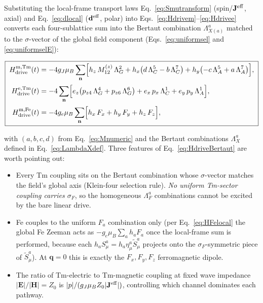 \documentclass[reprint,amsmath,amssymb,aps,prb,longbibliography]{revtex4-2}
\newcommand{\Jeff}{\mathbf{J}^{\rm eff}}
\newcommand{\deff}{\mathbf{d}^{\rm eff}}
\newcommand{\bfH}{\mathbf{H}}
\newcommand{\bfE}{\mathbf{E}}
\begin{document}
Substituting the local-frame transport laws Eq.~\eqref{eq:Smutransform}
(spin/$\Jeff$, axial) and Eq.~\eqref{eq:dlocal} ($\deff$, polar) into
Eqs.~\eqref{eq:Hdrivem}--\eqref{eq:Hdrivee} converts each four-sublattice
sum into the Bertaut combination $\Lambda^a_{X(a)}$ matched to
the $\sigma$-vector of the global field component (Eqs.~\eqref{eq:uniformsel}
and \eqref{eq:uniformselE}):
\begin{widetext}
\begin{equation}
\boxed{\;
\begin{aligned}
H_{\rm drive}^{\rm m,Tm}(t) &= -4 g_J\mu_B\sum_{\mathbf n}\Bigl[
h_z\,M^{(z)}_{12}\,\Lambda^2_G
+ h_x\bigl(d\,\Lambda^5_C - b\,\Lambda^7_C\bigr)
+ h_y\bigl(-c\,\Lambda^5_A + a\,\Lambda^7_A\bigr)
\Bigr],\\[2pt]
H_{\rm drive}^{\rm e,Tm}(t) &= -4\sum_{\mathbf n}\Bigl[
e_z\bigl(p_{z4}\,\Lambda^4_G + p_{z6}\,\Lambda^6_G\bigr)
+ e_x\,p_x\,\Lambda^1_C
+ e_y\,p_y\,\Lambda^1_A
\Bigr],\\[2pt]
H_{\rm drive}^{\rm m,Fe}(t) &= -4 g_e\mu_B\sum_{\mathbf n}\Bigl[
h_x\,F_x + h_y\,F_y + h_z\,F_z
\Bigr],
\end{aligned}\;}
\label{eq:HdriveBertaut}
\end{equation}
\end{widetext}
with $(a,b,c,d)$ from Eq.~\eqref{eq:Mnumeric} and the Bertaut
combinations $\Lambda^a_X$ defined in Eq.~\eqref{eq:LambdaXdef}. Three
features of Eq.~\eqref{eq:HdriveBertaut} are worth pointing out:
\begin{itemize}[leftmargin=*]
\item Every Tm coupling sits on the Bertaut combination whose
$\sigma$-vector matches the field's global axis (Klein-four selection
rule). \emph{No uniform Tm-sector coupling carries $\sigma_F$}, so the
homogeneous $\Lambda^a_F$ combinations cannot be excited by the bare
linear drive.
\item Fe couples to the uniform $F_a$ combination only (per
Eq.~\eqref{eq:HFelocal} the global Fe Zeeman acts as
$-g_e\mu_B\sum_a h_a F_a$ once the local-frame sum is performed,
because each $h_a S^a_\mu = h_a \eta^a_\mu \tilde S^a_\mu$ projects
onto the $\sigma_F$-symmetric piece of $\tilde S^a_\mu$). At
$\mathbf q=0$ this is exactly the $F_x, F_y, F_z$ ferromagnetic dipole.
\item The ratio of Tm-electric to Tm-magnetic coupling at fixed wave
impedance $|\bfE|/|\bfH|=Z_0$ is $|p|/(g_J\mu_B Z_0 |\Jeff|)$, controlling
which channel dominates each pathway.
\end{itemize}
\end{document}
